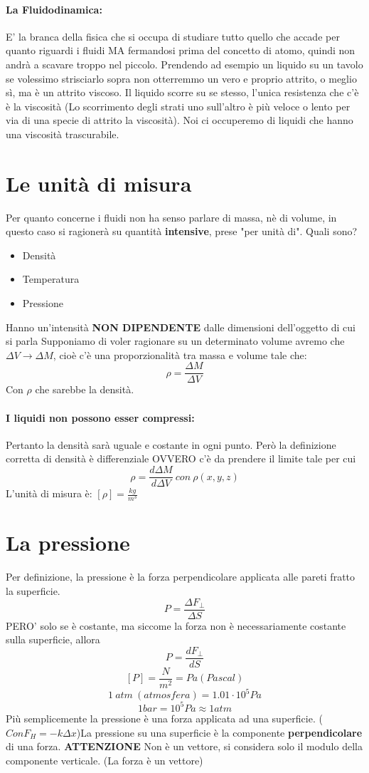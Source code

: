 \documentclass[12pt, a4paper, openany, oneside]{book}
\begin{document}
\paragraph{La Fluidodinamica: }
E' la branca della fisica che si occupa di studiare tutto quello che accade per
quanto riguardi i fluidi MA fermandosi prima del concetto di atomo, quindi non 
andrà a scavare troppo nel piccolo. Prendendo ad esempio un liquido su un tavolo
se volessimo strisciarlo sopra non otterremmo un vero e proprio attrito, o meglio
sì, ma è un attrito viscoso. Il liquido
scorre su se stesso, l'unica resistenza che c'è è la viscosità (Lo scorrimento
degli strati uno sull'altro è più veloce o lento per via di una specie di attrito
la viscosità). Noi ci occuperemo di liquidi che hanno una viscosità trascurabile.
\section{Le unità di misura}
Per quanto concerne i fluidi non ha senso parlare di massa, nè di volume, in 
questo caso si ragionerà su quantità \textbf{intensive}, prese "per unità di".
Quali sono? 
\begin{itemize}
	\item Densità
	\item Temperatura
	\item Pressione
\end{itemize}
Hanno un'intensità \textbf{NON DIPENDENTE} dalle dimensioni dell'oggetto di cui si parla
Supponiamo di voler ragionare su un determinato volume avremo che $\Delta V \to 
\Delta M$, cioè c'è una proporzionalità tra massa e volume tale che: 
\[
\rho = \frac{\Delta M}{\Delta V}
\]
Con $\rho$ che sarebbe la densità.
\paragraph{I liquidi non possono esser compressi: }Pertanto la densità sarà 
uguale e costante in ogni punto. Però la definizione corretta di densità è 
differenziale OVVERO c'è da prendere il limite tale per cui 
\[
\rho = \frac{d \Delta M}{d \Delta V} ~ con ~ \rho(x, y, z)
\]    
L'unità di misura è: $[\rho] = \frac{kg}{m^{3}}$
\section{La pressione}
Per definizione, la pressione è la forza perpendicolare applicata alle pareti 
fratto la superficie. 
\[
P = \frac{\Delta F_{\perp}}{\Delta S}
\]
PERO' solo se è costante, ma siccome la forza non è necessariamente costante
sulla superficie, allora
\[
P = \frac{dF_{\perp}}{dS}
\]
\[
[P] = \frac{N}{m^{2}} = Pa (Pascal)	
\]	
\[
1 ~ atm ~ (atmosfera) = 1.01 \cdot 10^{5} Pa
\]
\[
1 bar = 10^{5} Pa \approx 1 atm
\]
Più semplicemente la pressione è una forza applicata ad una superficie. ($
Con F_{H} = -k\Delta x $)La pressione su una superficie è la componente \textbf{
perpendicolare
} di una forza. \textbf{ATTENZIONE} Non è un vettore, si considera solo il 
modulo della componente verticale. (La forza è un vettore)
\end{document}
